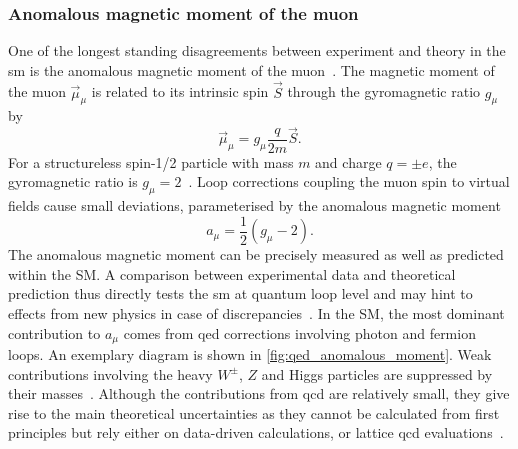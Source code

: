 
\subsubsection{Anomalous magnetic moment of the muon}

One of the longest standing disagreements between experiment and theory in the \gls{sm} is the anomalous magnetic moment of the muon~\cite{pdg2020}. The magnetic moment of the muon $\vec{\mu}_\mu$ is related to its intrinsic spin $\vec{S}$ through the gyromagnetic ratio $g_\mu$ by
\begin{equation}
	\vec{\mu}_\mu = g_\mu \frac{q}{2m} \vec{S}.
\end{equation}
For a structureless spin-1/2 particle with mass $m$ and charge $q=\pm e$, the gyromagnetic ratio is $g_\mu = 2$~\cite{Bennett:2006fi}. Loop corrections coupling the muon spin to virtual fields cause small deviations, parameterised by the anomalous magnetic moment
\begin{equation}
	a_\mu = \frac{1}{2}(g_\mu-2).
\end{equation}
The anomalous magnetic moment can be precisely measured as well as predicted within the SM. A comparison between experimental data and theoretical prediction thus directly tests the \gls{sm} at quantum loop level and may hint to effects from new physics in case of discrepancies~\cite{baer_tata_2006}.
In the SM, the most dominant contribution to $a_\mu$ comes from \gls{qed} corrections involving photon and fermion loops.
An exemplary diagram is shown in \cref{fig:qed_anomalous_moment}. Weak contributions involving the heavy $W^\pm$, $Z$ and Higgs particles are suppressed by their masses~\cite{Aoyama:2020ynm}.
Although the contributions from \gls{qcd} are relatively small, they give rise to the main theoretical uncertainties as they cannot be calculated from first principles but rely either on data-driven calculations, or lattice \gls{qcd} evaluations~\cite{Aoyama:2020ynm}.

